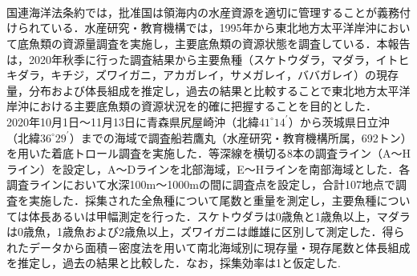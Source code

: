 \documentclass[12pt]{article}
\begin{document}
\setcounter{page}{1}
\renewcommand\citeleft{(}
\renewcommand\citeright{)}

\\
\\
\ \\

国連海洋法条約では，批准国は領海内の水産資源を適切に管理することが義務付けられている．水産研究・教育機構では，1995年から東北地方太平洋岸沖において底魚類の資源量調査を実施し，主要底魚類の資源状態を調査している．本報告は，2020年秋季に行った調査結果から主要魚種（スケトウダラ，マダラ，イトヒキダラ，キチジ，ズワイガニ，アカガレイ，サメガレイ，ババガレイ）の現存量，分布および体長組成を推定し，過去の結果と比較することで東北地方太平洋岸沖における主要底魚類の資源状況を的確に把握することを目的とした．
\ \\

2020年10月1日～11月13日に青森県尻屋崎沖（北緯$\textrm{41}^\circ \textrm{14}^\prime$）から茨城県日立沖（北緯$\textrm{36}^\circ \textrm{29}^\prime$）までの海域で調査船若鷹丸（水産研究・教育機構所属，692トン）を用いた着底トロール調査を実施した．等深線を横切る8本の調査ライン（A～Hライン）を設定し，A～Dラインを北部海域，E～Hラインを南部海域とした．各調査ラインにおいて水深100m～1000mの間に調査点を設定し，合計107地点で調査を実施した．採集された全魚種について尾数と重量を測定し，主要魚種については体長あるいは甲幅測定を行った．スケトウダラは0歳魚と1歳魚以上，マダラは0歳魚，1歳魚および2歳魚以上，ズワイガニは雌雄に区別して測定した．得られたデータから面積－密度法を用いて南北海域別に現存量・現存尾数と体長組成を推定し，過去の結果と比較した．なお，採集効率は1と仮定した.
\end{document}

